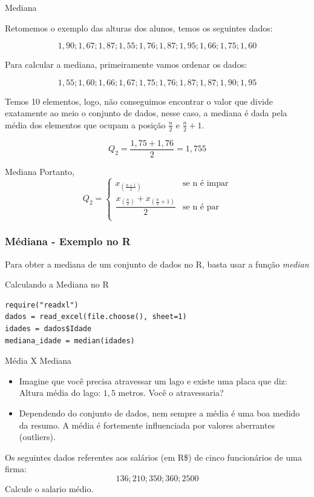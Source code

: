 \begin{frame}{Mediana}
\begin{exemplo}
Retomemos o exemplo das alturas dos alunos, temos os seguintes dados:

$$1,90; 1,67; 1,87; 1,55; 1,76; 1,87; 1,95; 1,66; 1,75; 1,60$$

\end{exemplo}

Para calcular a mediana, primeiramente vamos ordenar os dados:

$$ 1,55; 1,60; 1,66; 1,67; 1,75; 1,76;  1,87;  1,87; 1,90; 1,95$$

\pause

Temos 10 elementos, logo, não conseguimos encontrar o valor que divide exatamente ao meio o conjunto de dados, nesse caso, a mediana é dada pela média dos elementos que ocupam a posição $\frac{n}{2}$ e $\frac{n}{2} +1 $.

$$Q_2 = \dfrac{1,75 + 1,76}{2} = 1,755$$
\end{frame}

\begin{frame}{Mediana}
Portanto, 
$$Q_2 = \begin{cases}
    x_{\left(\frac{n+1}{2} \right)} & \text{se n é impar}\\
    \dfrac{x_{\left(\frac{n}{2}\right)} + x_{\left(\frac{n}{2} + 1 \right)} }{2} & \text{se n é par}\\
\end{cases}$$
\end{frame}

\begin{frame}[fragile]
\frametitle{Médiana - Exemplo no R}   
Para obter a mediana de um conjunto de dados no R, basta usar a função \textit{median}
\begin{block}{Calculando a Mediana no R}
\begin{verbatim}
require("readxl")
dados = read_excel(file.choose(), sheet=1) 
idades = dados$Idade
mediana_idade = median(idades)
\end{verbatim}
\end{block}
\end{frame}

\begin{frame}{Média X Mediana}

\begin{itemize}
    \item Imagine que você precisa atravessar um lago e existe uma placa que diz: Altura média do lago: $1,5$ metros. Você o atravessaria?
    \pause
    \item Dependendo do conjunto de dados, nem sempre a média é uma boa medido da resumo. A média é fortemente influenciada por valores aberrantes (outliers). 
\end{itemize}

\pause

\begin{exemplo}
    Os seguintes dados referentes aos salários (em R\$) de cinco funcionários de uma firma: $$136; 210; 350; 360; 2500$$ Calcule o salario médio. 
\end{exemplo}

\end{frame}

